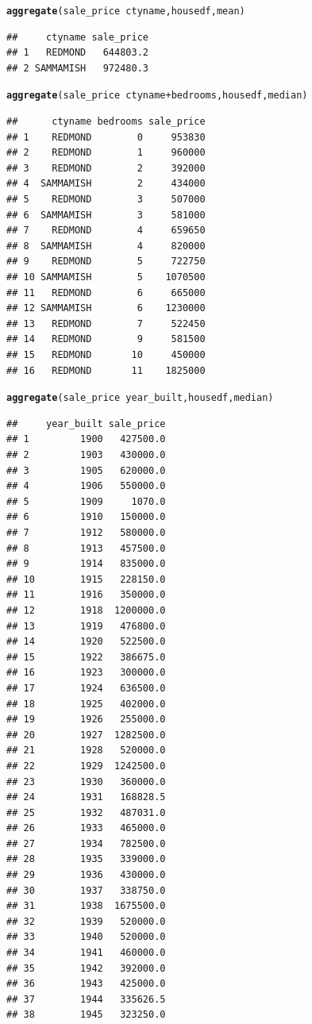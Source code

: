 \documentclass{article}\usepackage[]{graphicx}\usepackage[]{xcolor}
\makeatletter
\newcommand{\hlopt}[1]{\textcolor[rgb]{0,0,0}{#1}}%
\newcommand{\hlstd}[1]{\textcolor[rgb]{0.345,0.345,0.345}{#1}}%
\newcommand{\hlkwd}[1]{\textcolor[rgb]{0.737,0.353,0.396}{\textbf{#1}}}%
\newenvironment{kframe}{%
 \def\at@end@of@kframe{}%
 \ifinner\ifhmode%
  \def\at@end@of@kframe{\end{minipage}}%
  \begin{minipage}{\columnwidth}%
 \fi\fi%
 \def\FrameCommand##1{\hskip\@totalleftmargin \hskip-\fboxsep
 \colorbox{shadecolor}{##1}\hskip-\fboxsep
     \hskip-\linewidth \hskip-\@totalleftmargin \hskip\columnwidth}%
 \MakeFramed {\advance\hsize-\width
   \@totalleftmargin\z@ \linewidth\hsize
   \@setminipage}}%
 {\par\unskip\endMakeFramed%
 \at@end@of@kframe}
\newenvironment{knitrout}{}{} %
\makeatother
\begin{document}
\begin{knitrout}
\begin{kframe}
\begin{alltt}
\hlkwd{aggregate}\hlstd{(sale_price}\hlopt{~}\hlstd{ctyname,housedf,mean)}
\end{alltt}
\begin{verbatim}
##     ctyname sale_price
## 1   REDMOND   644803.2
## 2 SAMMAMISH   972480.3
\end{verbatim}
\begin{alltt}
\hlkwd{aggregate}\hlstd{(sale_price}\hlopt{~}\hlstd{ctyname} \hlopt{+} \hlstd{bedrooms, housedf, median)}
\end{alltt}
\begin{verbatim}
##      ctyname bedrooms sale_price
## 1    REDMOND        0     953830
## 2    REDMOND        1     960000
## 3    REDMOND        2     392000
## 4  SAMMAMISH        2     434000
## 5    REDMOND        3     507000
## 6  SAMMAMISH        3     581000
## 7    REDMOND        4     659650
## 8  SAMMAMISH        4     820000
## 9    REDMOND        5     722750
## 10 SAMMAMISH        5    1070500
## 11   REDMOND        6     665000
## 12 SAMMAMISH        6    1230000
## 13   REDMOND        7     522450
## 14   REDMOND        9     581500
## 15   REDMOND       10     450000
## 16   REDMOND       11    1825000
\end{verbatim}
\begin{alltt}
\hlkwd{aggregate}\hlstd{(sale_price}\hlopt{~}\hlstd{year_built,housedf,median)}
\end{alltt}
\begin{verbatim}
##     year_built sale_price
## 1         1900   427500.0
## 2         1903   430000.0
## 3         1905   620000.0
## 4         1906   550000.0
## 5         1909     1070.0
## 6         1910   150000.0
## 7         1912   580000.0
## 8         1913   457500.0
## 9         1914   835000.0
## 10        1915   228150.0
## 11        1916   350000.0
## 12        1918  1200000.0
## 13        1919   476800.0
## 14        1920   522500.0
## 15        1922   386675.0
## 16        1923   300000.0
## 17        1924   636500.0
## 18        1925   402000.0
## 19        1926   255000.0
## 20        1927  1282500.0
## 21        1928   520000.0
## 22        1929  1242500.0
## 23        1930   360000.0
## 24        1931   168828.5
## 25        1932   487031.0
## 26        1933   465000.0
## 27        1934   782500.0
## 28        1935   339000.0
## 29        1936   430000.0
## 30        1937   338750.0
## 31        1938  1675500.0
## 32        1939   520000.0
## 33        1940   520000.0
## 34        1941   460000.0
## 35        1942   392000.0
## 36        1943   425000.0
## 37        1944   335626.5
## 38        1945   323250.0

\end{verbatim}
\end{kframe}
\end{knitrout}
\end{document}
